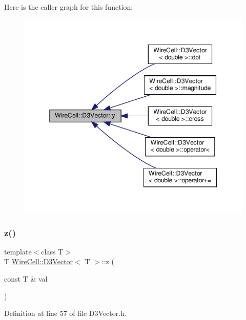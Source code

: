 Here is the caller graph for this function\+:
\nopagebreak
\begin{figure}[H]
\begin{center}
\leavevmode
\includegraphics[width=345pt]{class_wire_cell_1_1_d3_vector_ad570e3dbb22e60a480ced87c278f4466_icgraph}
\end{center}
\end{figure}
\mbox{\label{class_wire_cell_1_1_d3_vector_aabb1a5422a461697542a6755f30b575e}} 
\subsubsection{\texorpdfstring{z()}{z()}\hspace{0.1cm}{\footnotesize\ttfamily [1/2]}}
{\footnotesize\ttfamily template$<$class T$>$ \\
T \hyperlink{class_wire_cell_1_1_d3_vector}{Wire\+Cell\+::\+D3\+Vector}$<$ T $>$\+::z (\begin{DoxyParamCaption}\item[{const T \&}]{val }\end{DoxyParamCaption})\hspace{0.3cm}{\ttfamily [inline]}}



Definition at line 57 of file D3\+Vector.\+h.

